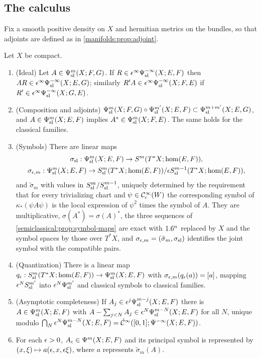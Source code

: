 \subsection{The calculus}
Fix a smooth positive density on $X$ and hermitian metrics on the bundles, so
that adjoints are defined as in \cref{manifolds:prop:adjoint}.

\begin{theorem}\label{semiclassical:thm:manifold-calculus}
  Let $X$ be compact.
  \begin{enumerate}[label=\textup{(\alph*)}]
  \item \textup{(Ideal)} Let $A\in\Psi^{m}_{\mathrm{sl}}(X;F,G)$. If
    $R\in\epsilon^\infty\Psi^{-\infty}_{\mathrm{sl}}(X;E,F)$ then
    $AR\in\epsilon^\infty\Psi^{-\infty}_{\mathrm{sl}}(X;E,G)$; similarly
    $R'A\in\epsilon^\infty\Psi^{-\infty}_{\mathrm{sl}}(X;F,E)$ if $R'\in\epsilon^\infty\Psi^{-\infty}_{\mathrm{sl}}(X;G,E)$.
  \item \textup{(Composition and adjoints)}
    $\Psi^{m}_{\mathrm{sl}}(X;F,G)\circ\Psi^{m'}_{\mathrm{sl}}(X;E,F)\subset\Psi^{m+m'}_{\mathrm{sl}}(X;E,G)$, and
    $A\in\Psi^{m}_{\mathrm{sl}}(X;E,F)$ implies $A^*\in\Psi^{m}_{\mathrm{sl}}(X;F,E)$. The same holds for the
    classical families.
  \item \textup{(Symbols)} There are linear maps
    \begin{gather*}
      \sigma_{\mathrm{sl}}:\Psi^{m}_{\mathrm{sl}}(X;E,F)\to S^m(T^*X;\hom(E,F)),\\
      \sigma_{\epsilon,m}:\Psi^{m}_{\mathrm{sl}}(X;E,F)\to S^{m}_{\mathrm{sl}}(T^*X;\hom(E,F))/\epsilon S^{m-1}_{\mathrm{sl}}(T^*X;\hom(E,F)),
    \end{gather*}
    and $\tilde\sigma_m$ with values in $S^{m}_{\mathrm{sl}}/S^{m-1}_{\mathrm{sl}}$, uniquely determined by
    the requirement that for every trivializing chart and $\psi\in\mathcal{C}^\infty_{\mathrm{c}}(W)$ the
    corresponding symbol of $\kappa_*(\psi A\psi)$ is the local expression of
    $\psi^2$ times the symbol of $A$. They are multiplicative,
    $\sigma(A^*)=\sigma(A)^*$, the three sequences of
    \cref{semiclassical:prop:symbol-maps} are exact with $1.6^n$ replaced by $X$
    and the symbol spaces by those over $T^*X$, and
    $\sigma_{\epsilon,m}=(\tilde\sigma_m,\sigma_{\mathrm{sl}})$ identifies the joint symbol with the
    compatible pairs.
  \item \textup{(Quantization)} There is a linear map
    $q_\epsilon:S^{m}_{\mathrm{sl}}(T^*X;\hom(E,F))\to\Psi^{m}_{\mathrm{sl}}(X;E,F)$ with
    $\sigma_{\epsilon,m}(q_\epsilon(a))=[a]$, mapping $\epsilon^NS^{m'}_{\mathrm{sl}}$ into $\epsilon^N\Psi^{m'}_{\mathrm{sl}}$
    and classical symbols to classical families.
  \item \textup{(Asymptotic completeness)} If $A_j\in\epsilon^j\Psi^{m-j}_{\mathrm{sl}}(X;E,F)$
    there is $A\in\Psi^{m}_{\mathrm{sl}}(X;E,F)$ with $A-\sum_{j<N}A_j\in\epsilon^N\Psi^{m-N}_{\mathrm{sl}}(X;E,F)$
    for all $N$, unique modulo
    $\bigcap_N\epsilon^N\Psi^{m-N}_{\mathrm{sl}}(X;E,F)=\dot{\mathcal{C}}^\infty([0,1];\Psi^{-\infty}(X;E,F))$.
  \item For each $\epsilon>0$, $A_\epsilon\in\Psi^{m}(X;E,F)$ and its principal symbol is
    represented by $(x,\xi)\mapsto a(\epsilon,x,\epsilon\xi)$, where $a$ represents
    $\tilde\sigma_m(A)$.
  \end{enumerate}
\end{theorem}
